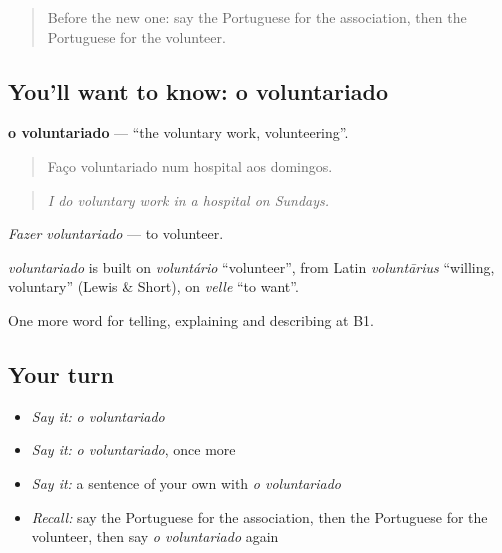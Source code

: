 \label{lesson:PT-C367-voluntariado}



\begin{quote}
Before the new one: say the Portuguese for the association, then the Portuguese for the volunteer.
\end{quote}

\subsection*{You'll want to know: o voluntariado}
\textbf{o voluntariado} — \textquotedblleft{}the voluntary work, volunteering\textquotedblright{}.

\begin{quote}
Faço voluntariado num hospital aos domingos.
\end{quote}

\begin{quote}
\emph{I do voluntary work in a hospital on Sundays.}
\end{quote}

\emph{Fazer voluntariado} — to volunteer.

\begin{cousinweb}
\emph{voluntariado} is built on \emph{voluntário} \textquotedblleft{}volunteer\textquotedblright{}, from Latin \emph{voluntārius} \textquotedblleft{}willing, voluntary\textquotedblright{} (Lewis \& Short), on \emph{velle} \textquotedblleft{}to want\textquotedblright{}.
\end{cousinweb}

\begin{grammarlens}[title={What you've built}]
One more word for telling, explaining and describing at B1.
\end{grammarlens}

\subsection*{Your turn}
\begin{itemize}
\raggedright
  \item \emph{Say it:} \emph{o voluntariado}
  \item \emph{Say it:} \emph{o voluntariado}, once more
  \item \emph{Say it:} a sentence of your own with \emph{o voluntariado}
  \item \emph{Recall:} say the Portuguese for the association, then the Portuguese for the volunteer, then say \emph{o voluntariado} again
\end{itemize}

